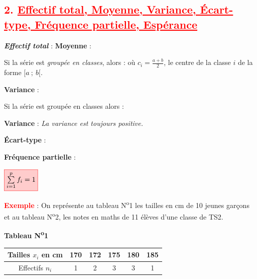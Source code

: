 \documentclass[12pt,a4paper]{article}
\begin{document}
\subsection*{\textcolor{red}{2. \underline{Effectif total, Moyenne, Variance, Écart-type, Fréquence partielle, Espérance}}}

\textbf{\textit{Effectif total}} : 
 \quad 
\textbf{Moyenne} : 

\vspace{0.2cm}

Si la série est \textit{groupée en classes}, alors : 
\noindent
{}
\quad où \(c_i = \frac{a + b}{2}\), le centre de la classe \(i\) de la forme \([a~;~b[\).

\vspace{0.2cm}

\textbf{Variance} : 

\vspace{0.2cm}

Si la série est groupée en classes alors :

\textbf{Variance} : 
 \quad \textit{La variance est toujours positive.}

\vspace{0.2cm}

\textbf{Écart-type} : 

\textbf{Fréquence partielle} : 

$
\fcolorbox{red}{red!20}{$\sum\limits_{i=1}^{p} f_i = 1$}
$

\noindent
\textbf{\textcolor{red}{Exemple}} : On représente au tableau N\textsuperscript{o}1 les tailles en cm de 10 jeunes garçons et au tableau N\textsuperscript{o}2, les notes en maths de 11 élèves d’une classe de TS2.

\vspace{0.5cm}

\begin{center}
\textbf{Tableau N\textsuperscript{o}1}

\vspace{0.2cm}
\begin{tabular}{|c|c|c|c|c|c|}
\hline
Tailles \( x_i \) en cm & 170 & 172 & 175 & 180 & 185 \\
\hline
Effectifs \( n_i \) & 1 & 2 & 3 & 3 & 1 \\
\hline
\end{tabular}
\end{center}
\end{document}
